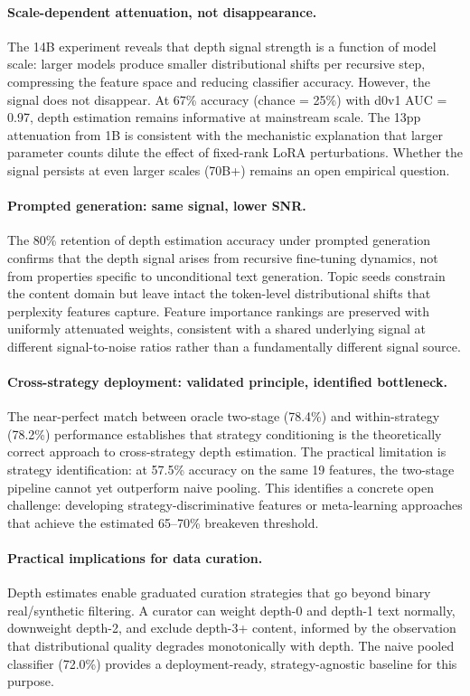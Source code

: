 \documentclass[11pt,a4paper]{article}
\begin{document}
\paragraph{Scale-dependent attenuation, not disappearance.}
The 14B experiment reveals that depth signal strength is a function of model scale: larger models produce smaller distributional shifts per recursive step, compressing the feature space and reducing classifier accuracy. However, the signal does not disappear. At 67\% accuracy (chance = 25\%) with d0v1 AUC = 0.97, depth estimation remains informative at mainstream scale. The 13pp attenuation from 1B is consistent with the mechanistic explanation that larger parameter counts dilute the effect of fixed-rank LoRA perturbations. Whether the signal persists at even larger scales (70B+) remains an open empirical question.

\paragraph{Prompted generation: same signal, lower SNR.}
The 80\% retention of depth estimation accuracy under prompted generation confirms that the depth signal arises from recursive fine-tuning dynamics, not from properties specific to unconditional text generation. Topic seeds constrain the content domain but leave intact the token-level distributional shifts that perplexity features capture. Feature importance rankings are preserved with uniformly attenuated weights, consistent with a shared underlying signal at different signal-to-noise ratios rather than a fundamentally different signal source.

\paragraph{Cross-strategy deployment: validated principle, identified bottleneck.}
The near-perfect match between oracle two-stage (78.4\%) and within-strategy (78.2\%) performance establishes that strategy conditioning is the theoretically correct approach to cross-strategy depth estimation. The practical limitation is strategy identification: at 57.5\% accuracy on the same 19 features, the two-stage pipeline cannot yet outperform naive pooling. This identifies a concrete open challenge: developing strategy-discriminative features or meta-learning approaches that achieve the estimated 65--70\% breakeven threshold.

\paragraph{Practical implications for data curation.}
Depth estimates enable graduated curation strategies that go beyond binary real/synthetic filtering. A curator can weight depth-0 and depth-1 text normally, downweight depth-2, and exclude depth-3+ content, informed by the observation that distributional quality degrades monotonically with depth. The naive pooled classifier (72.0\%) provides a deployment-ready, strategy-agnostic baseline for this purpose.
\end{document}
